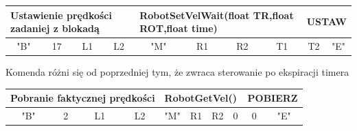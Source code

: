 \documentclass[eng,printmode]{mgr}
\begin{document}
\begin{table}[!htb]
\centering
\begin{adjustbox}{width=1\textwidth}
\label{my-label}
\begin{tabular}{|c|c|c|c|c|c|c|c|c|c|}
\hline
\multicolumn{4}{|l|}{Ustawienie prędkości zadaniej z blokadą} & \multicolumn{4}{l|}{RobotSetVelWait(float TR,float ROT,float time)} & \multicolumn{2}{l|}{USTAW} \\ \hline
"B" \hspace{1em}             & 17\hspace{2em}              & L1\hspace{2em}              & L2\hspace{2em}         & "M"\hspace{2em}         & R1\hspace{2em}         & R2\hspace{2em}         & T1\hspace{2em}         & T2\hspace{2em}          & "E"\hspace{2em}          \\ \hline
\end{tabular}
\end{adjustbox}
\end{table}

Komenda różni się od poprzedniej tym, że zwraca sterowanie po ekspiracji timera

\begin{table}[!htb]
\centering
\begin{adjustbox}{width=1\textwidth}
\label{my-label}
\begin{tabular}{|c|c|c|c|c|c|c|c|c|c|}
\hline
\multicolumn{4}{|l|}{Pobranie faktycznej prędkości } & \multicolumn{4}{l|}{RobotGetVel()} & \multicolumn{2}{l|}{POBIERZ} \\ \hline
"B" \hspace{1em}             & 2\hspace{2em}              & L1\hspace{2em}              & L2\hspace{2em}         & "M"\hspace{2em}         & R1\hspace{2em}         & R2\hspace{2em}         & 0\hspace{2em}         & 0\hspace{2em}          & "E"\hspace{2em}          \\ \hline
\end{tabular}
\end{adjustbox}
\end{table}
\end{document}
